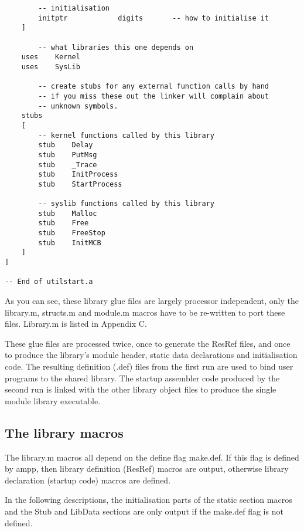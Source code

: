 \begin{verbatim}
        -- initialisation
        initptr            digits       -- how to initialise it
    ]

        -- what libraries this one depends on
    uses    Kernel                 
    uses    SysLib

        -- create stubs for any external function calls by hand
        -- if you miss these out the linker will complain about
        -- unknown symbols.
    stubs
    [
        -- kernel functions called by this library
        stub    Delay
        stub    PutMsg
        stub    _Trace
        stub    InitProcess
        stub    StartProcess

        -- syslib functions called by this library
        stub    Malloc
        stub    Free
        stub    FreeStop
        stub    InitMCB
    ]
]

-- End of utilstart.a
\end{verbatim}
\normalsize

As you can see, these library glue files are largely processor independent,
only the library.m, structs.m and module.m macros have to be re-written to
port these files. Library.m is listed in Appendix C.

These glue files are processed twice, once to generate the ResRef
files, and once to produce the library's module header, static data
declarations and initialisation code. The resulting definition (.def) files
from the first run are used to bind user programs to the shared library.
The startup assembler code produced by the second run is linked with the
other library object files to produce the single module library executable.

\subsection{The library macros}

The library.m macros all depend on the define flag make.def. If this
flag is defined by ampp, then library definition (ResRef) macros are output,
otherwise library declaration (startup code) macros are defined.

In the following descriptions, the initialisation parts of the static
section macros and the Stub and LibData sections are only output if
the make.def flag is not defined.
\vfill
\newpage

